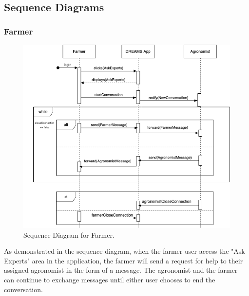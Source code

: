 \newpage
\subsection{Sequence Diagrams}

\subsubsection{Farmer}
\begin{figure}[hbt!]
\centering
\includegraphics[scale=0.6]{Files/sequence_disgrams/thePNGs/farmer_askExperts.png}
\caption{\label{fig:farmerSeqRequest}Sequence Diagram for Farmer.}
\end{figure}

\begin{flushleft}
As demonstrated in the sequence diagram, when the farmer user access the "Ask Experts" area in the application, the farmer will send a request for help to their assigned agronomist in the form of a message. The agronomist and the farmer can continue to exchange messages until either user chooses to end the conversation.
\end{flushleft}



